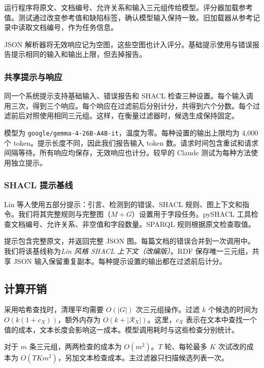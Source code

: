 运行程序将原文、文档编号、允许关系和输入三元组传给模型。评分器加载参考值。测试通过改变参考值和缺陷标签，确认模型输入保持一致。旧加载器从参考记录中读取文档编号，作为任务信息。

JSON 解析器将无效响应记为空图，这些空图也计入评分。基础提示使用与错误报告提示相同的输入和输出上限，但去掉报告。

\subsubsection{共享提示与响应}

同一个系统提示支持基础输入、错误报告和 SHACL 检查三种设置。每个输入调用三次，得到三个响应。每个响应在过滤前后分别计分，共得到六个分数。每个过滤前后对照使用相同三元组。这样，在衡量过滤器时，候选生成保持固定。

模型为 \texttt{google/gemma-4-26B-A4B-it}，温度为零。每种设置的输出上限均为 4,000 个 token。提示长度不同，因此我们报告输入 token 数。请求时间包含重试和请求间隔等待。所有响应均保存，无效响应也计分。较早的 Claude 测试为每种方法使用独立提示。

\subsubsection{SHACL 提示基线}
\label{sec:impl:shacl}

Lin 等人使用五部分提示：引言、检测到的错误、SHACL 规则、图上下文和指令\citep{ref_lin2025}。我们将其完整规则与完整图（$M+G$）设置用于字段任务。pySHACL 工具检查文档编号、允许关系、非空值和字段数量。SPARQL 规则根据原文检查取值。

提示包含完整原文，并返回完整 JSON 图。每篇文档的错误合并到一次调用中。我们将该基线称为\emph{Lin 风格 SHACL 上下文（改编版）}。RDF 保存唯一三元组，共享 JSON 输入保留重复副本。每种提示设置的输出都在过滤前后计分。

\subsection{计算开销}

采用哈希查找时，清理平均需要 $O(|G|)$ 次三元组操作。过滤 $k$ 个候选的时间为 $O(k(1+c_X))$，额外内存为 $O(k+|\mathcal R_X|)$。这里，$c_X$ 表示在文本中查找一个值的成本，文本长度会影响这一成本。模型调用耗时与这些检查分别统计。

对于 $m$ 条三元组，两两检查的成本为 $O(m^2)$。$T$ 轮、每轮最多 $K$ 次试改的成本为 $O(TKm^2)$，另加文本检查成本。主过滤器只扫描候选列表一次。